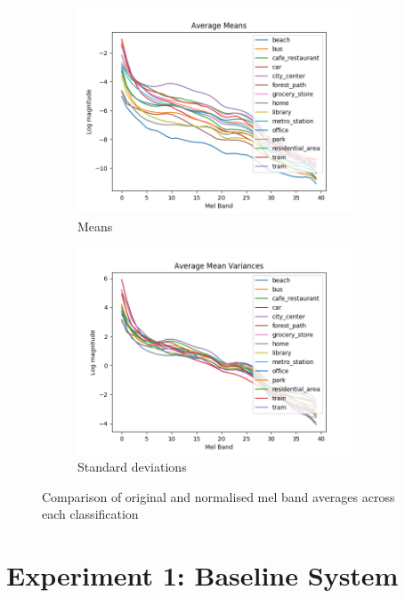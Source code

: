 \documentclass[11pt]{article}
\begin{document}
\begin{figure}[!htbp]
	\centering
	\begin{subfigure}[t]{0.48\textwidth}
		\centering
		\includegraphics[width=0.9\textwidth]{figures/allMeans.png}
		\caption{Means}
	\end{subfigure}
	\begin{subfigure}[t]{0.48\textwidth}
		\centering
		\includegraphics[width=0.9\textwidth]{figures/allMeanVars.png}
		\caption{Standard deviations}
	\end{subfigure}
	\caption{Comparison of original and normalised mel band averages across each classification}
	\label{fig:cmpOrigAndNorm}
\end{figure}






\pagebreak
\section{Experiment 1: Baseline System}
\label{sec:exp1}
\end{document}
